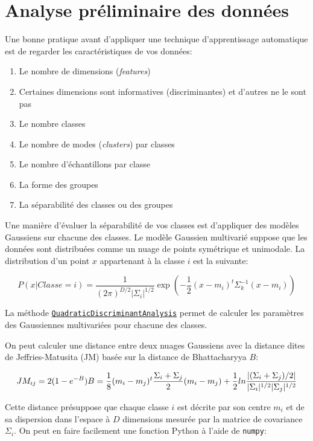 \documentclass[
  11pt,
  letterpaper,
  open=any,
  twoside=false,
  french]{scrbook}
\begin{document}
\section{Analyse préliminaire des
données}\label{analyse-pruxe9liminaire-des-donnuxe9es}

Une bonne pratique avant d'appliquer une technique d'apprentissage
automatique est de regarder les caractéristiques de vos données:

\begin{enumerate}
\def\labelenumi{\arabic{enumi}.}
\item
  Le nombre de dimensions (\emph{features})
\item
  Certaines dimensions sont informatives (discriminantes) et d'autres ne
  le sont pas
\item
  Le nombre classes
\item
  Le nombre de modes (\emph{clusters}) par classes
\item
  Le nombre d'échantillons par classe
\item
  La forme des groupes
\item
  La séparabilité des classes ou des groupes
\end{enumerate}

Une manière d'évaluer la séparabilité de vos classes est d'appliquer des
modèles Gaussiens sur chacune des classes. Le modèle Gaussien multivarié
suppose que les données sont distribuées comme un nuage de points
symétrique et unimodale. La distribution d'un point \(x\) appartenant à
la classe \(i\) est la suivante:

\[
P(x | Classe=i) = \frac{1}{(2\pi)^{D/2} |\Sigma_i|^{1/2}}\exp\left(-\frac{1}{2} (x-m_i)^t \Sigma_k^{-1} (x-m_i)\right)
\]

La méthode
\href{https://scikit-learn.org/stable/modules/generated/sklearn.discriminant_analysis.QuadraticDiscriminantAnalysis.html}{\texttt{QuadraticDiscriminantAnalysis}}
permet de calculer les paramètres des Gaussiennes multivariées pour
chacune des classes.

On peut calculer une distance entre deux nuages Gaussiens avec la
distance dites de Jeffries-Matusita (JM) basée sur la distance de
Bhattacharyya \(B\):

\[
JM_{ij}= 2(1-e^{-B})\\
B=\frac{1}{8}(m_i-m_j)^t { \frac{\Sigma_i+\Sigma_j}{2} }(m_i-m_j)+\frac{1}{2}ln { \frac{|(\Sigma_i+\Sigma_j)/2|}{|\Sigma_i|^{1/2}|\Sigma_j|^{1/2}}}
\]

Cette distance présuppose que chaque classe \(i\) est décrite par son
centre \(m_i\) et de sa dispersion dans l'espace à \(D\) dimensions
mesurée par la matrice de covariance \(\Sigma_i\). On peut en faire
facilement une fonction Python à l'aide de \texttt{numpy}:
\end{document}
